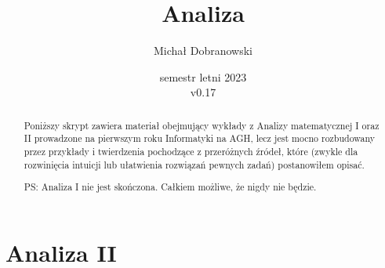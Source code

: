 \documentclass[11pt]{scrartcl}
\title{Analiza}
\author{Michał Dobranowski}
\date{semestr letni 2023\\ v0.17}
\begin{document}
    \maketitle
    \begin{abstract}
        Poniższy skrypt zawiera materiał obejmujący wykłady z Analizy matematycznej I oraz II prowadzone na pierwszym roku Informatyki na AGH, lecz jest mocno rozbudowany przez przykłady i twierdzenia pochodzące z przeróżnych źródeł, które (zwykle dla rozwinięcia intuicji lub ułatwienia rozwiązań pewnych zadań) postanowiłem opisać.

        PS: Analiza I nie jest skończona. Całkiem możliwe, że nigdy nie będzie.
    \end{abstract}
    \tableofcontents
    \eject






    \part{Analiza II}
\end{document}
